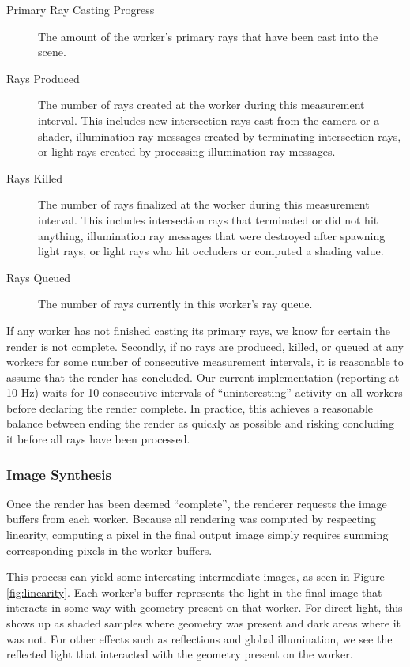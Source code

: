\documentclass[a4paper,twoside]{article}
\begin{document}
\begin{description}
   \item[Primary Ray Casting Progress] The amount of the worker's primary rays
      that have been cast into the scene.
   \item[Rays Produced] The number of rays created at the worker during this
      measurement interval. This includes new intersection rays cast from the
      camera or a shader, illumination ray messages created by terminating
      intersection rays, or light rays created by processing illumination ray
      messages.
   \item[Rays Killed] The number of rays finalized at the worker during this
      measurement interval. This includes intersection rays that terminated or
      did not hit anything, illumination ray messages that were destroyed after
      spawning light rays, or light rays who hit occluders or computed a shading
      value.
   \item[Rays Queued] The number of rays currently in this worker's ray queue.
\end{description}

If any worker has not finished casting its primary rays, we know for certain the
render is not complete. Secondly, if no rays are produced, killed, or queued at
any workers for some number of consecutive measurement intervals, it is
reasonable to assume that the render has concluded. Our current implementation
(reporting at 10 Hz) waits for 10 consecutive intervals of ``uninteresting''
activity on all workers before declaring the render complete. In practice, this
achieves a reasonable balance between ending the render as quickly as possible
and risking concluding it before all rays have been processed.

\subsubsection{Image Synthesis}
\label{synthesis}

Once the render has been deemed ``complete'', the renderer requests the image
buffers from each worker. Because all rendering was computed by respecting
linearity, computing a pixel in the final output image simply requires summing
corresponding pixels in the worker buffers.

This process can yield some interesting intermediate images, as seen in Figure
\ref{fig:linearity}. Each worker's buffer represents the light in the final
image that interacts in some way with geometry present on that worker. For
direct light, this shows up as shaded samples where geometry was present and
dark areas where it was not. For other effects such as reflections and global
illumination, we see the reflected light that interacted with the geometry
present on the worker.
\end{document}
